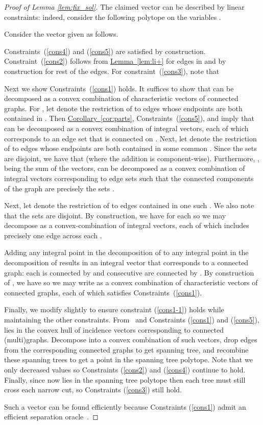 \documentclass[11pt]{article}
\newcommand{\lref}[2][]{\hyperref[#2]{#1~\ref*{#2}}}
\theoremstyle{definition}
\newcounter{note}[section]
\begin{document}
\begin{proof}[Proof of Lemma \ref{lem:fix_sol}]
  The claimed vector  can be described by linear constraints: indeed,
  consider the following polytope on the variables .


Consider the vector  given as follows.


Constraints~(\ref{cons4}) and (\ref{cons5}) are satisfied by
construction. Constraint~(\ref{cons2}) follows from \lref[Lemma]{lem:li+}
for edges in  and by construction for rest of the
edges. For constraint~(\ref{cons3}), note that


Next we show Constraints~(\ref{cons1}) holds.  It suffices to
show that  can be decomposed as a convex combination of characteristic
vectors of connected graphs. For
, let  denote the restriction of  to
edges whose endpoints are both contained in . Then
\lref[Corollary]{cor:parts}, Constraints~(\ref{cons5}), and
\cite[Corollary~50.8a]{Schrijver-book} imply that  can be
decomposed as a convex combination of integral vectors, each of which
corresponds to an edge set that is connected on .  Next, let 
denote the restriction of  to edges whose endpoints are both
contained in some common . Since the sets  are disjoint, we have that  (where the
addition is component-wise). Furthermore,
, being the sum of the  vectors,
can be decomposed as a convex combination of integral vectors
corresponding to edge sets  such that the connected components of
the graph  are precisely the sets
.


Next, let  denote the restriction of  to edges contained
in one such .  We also note that the sets
 are disjoint.  By
construction, we have  for each  so we may decompose  as a convex-combination of integral
vectors, each of which includes precisely one edge across each
.

Adding any integral point  in the decomposition of  to any
integral point  in the decomposition of  results
in an integral vector that corresponds to a connected graph:
each  is connected by  and consecutive  are connected
by . By construction of , we have 
so we may write  as a convex combination of characteristic vectors
of connected graphs, each of which satisfies Constraints~(\ref{cons1}).

Finally, we modify  slightly to ensure constraint (\ref{cons1-1}) holds while maintaining
the other constraints. From~\cite[Corollary~50.8a]{Schrijver-book} and
Constraints (\ref{cons1}) and (\ref{cons5}),
 lies in the convex hull of incidence vectors corresponding to connected
(multi)graphs. Decompose  into a convex combination of such vectors,
drop edges from the corresponding connected graphs to get spanning tree,
and recombine these spanning trees to get a point in the spanning
tree polytope. Note that we only decreased  values
so Constraints (\ref{cons2}) and (\ref{cons4}) continue to hold.
Finally, since  now lies in the spanning tree polytope
then each tree must still cross each narrow cut, so Constraints (\ref{cons3}) still hold.

Such a vector can be found efficiently because Constraints (\ref{cons1}) admit
an efficient separation oracle~\cite[Corollary~51.3b]{Schrijver-book}.
\end{proof}
\end{document}
